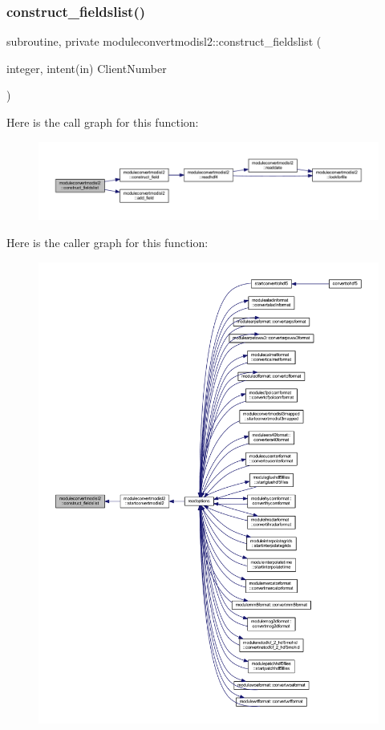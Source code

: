 \subsubsection{\texorpdfstring{construct\+\_\+fieldslist()}{construct\_fieldslist()}}
{\footnotesize\ttfamily subroutine, private moduleconvertmodisl2\+::construct\+\_\+fieldslist (\begin{DoxyParamCaption}\item[{integer, intent(in)}]{Client\+Number }\end{DoxyParamCaption})\hspace{0.3cm}{\ttfamily [private]}}

Here is the call graph for this function\+:\nopagebreak
\begin{figure}[H]
\begin{center}
\leavevmode
\includegraphics[width=350pt]{namespacemoduleconvertmodisl2_ab79be5b024d52c708202d2716a6467e7_cgraph}
\end{center}
\end{figure}
Here is the caller graph for this function\+:\nopagebreak
\begin{figure}[H]
\begin{center}
\leavevmode
\includegraphics[width=350pt]{namespacemoduleconvertmodisl2_ab79be5b024d52c708202d2716a6467e7_icgraph}
\end{center}
\end{figure}
